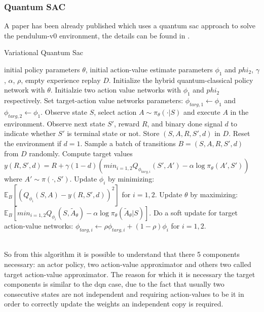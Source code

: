 \subsubsection{Quantum SAC}
A paper has been already published which uses a quantum \acrshort{sac} approach to solve the pendulum-v0 environment, the details can be found in \cite{https://doi.org/10.48550/arxiv.2112.11921}.
\begin{algorithm} \label{qsac}
	\caption{Variational Quantum Sac}
	\begin{algorithmic}
		\REQUIRE initial policy parameters $\theta$, initial action-value estimate parameters $\phi_1$ and $phi_2$, $\gamma$, $\alpha$, $\rho$, empty experience replay $D$.
		\STATE Initialize the hybrid quantum-classical policy network with $\theta$.
		\STATE Initialzie two action value networks with $\phi_1$ and $phi_2$ respectively.
		\STATE Set target-action value networks parameters: $\phi_{targ, 1} \leftarrow \phi_1$ and $\phi_{targ, 2} \leftarrow \phi_1$.
			\STATE Observe state $S$, select action $A \sim \pi_{\theta}(\cdot |S)$ and execute $A$ in the environment.
			\STATE Observe next state $S'$, reward $R$, and binary done signal $d$ to indicate whether $S'$ is terminal state or not.
			\STATE Store $(S,A,R,S',d)$ in $D$.
			\STATE Reset the environment if $d=1$.
			\STATE Sample a batch of transitions $B = {(S,A,R,S',d)}$ from $D$ randomly.
			\STATE Compute target values $y(R,S',d) = R + \gamma (1-d) (min_{i=1,2}Q_{\phi_{targ,i}} (S',A') - \alpha \log \pi_{\theta}(A',S'))$ where $A' \sim \pi(\cdot,S')$.
			\STATE Update $\phi_i$ by minimizing: $\mathbb{E}_B [(Q_{\phi_i}(S,A) - y(R,S',d))^2]$ for $i = 1,2$.
			\STATE Update $\theta$ by maximizing: $\mathbb{E}_B [min_{i=1,2} Q_{\phi_i}(S,\tilde{A}_\theta) - \alpha \log \pi_{\theta}(\tilde{A}_\theta|S)]$.
			\STATE Do a soft update for target action-value networks: $\phi_{targ,i} \leftarrow \rho \phi_{targ,i} + (1-\rho)\phi_i$ for $i=1,2$.
		\ENDFOR
	\end{algorithmic}
\end{algorithm}\\
So from this algorithm it is possible to understand that there 5 components necessary: an actor policy, two action-value approximator and others two called target action-value approximator.
The reason for which it is necessary the target components is similar to the \acrshort{dqn} case, due to the fact that usually two consecutive states are not independent and requiring action-values to be it in order to correctly update the weights an independent copy is required.
